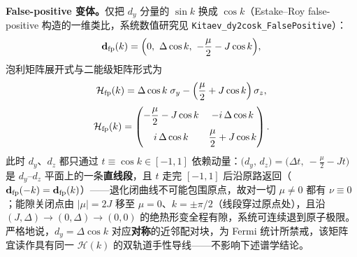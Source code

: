 \documentclass[onecolumn,aps,prl,superscriptaddress,longbibliography]{revtex4-2}
\begin{document}
\textbf{False-positive 变体。}仅把 $d_y$ 分量的 $\sin k$ 换成 $\cos k$（Estake--Roy false-positive 构造的一维类比，系统数值研究见 \texttt{Kitaev\_dy2cosk\_FalsePositive}）：
\begin{equation}\label{eq:fp_d}
\mathbf{d}_{\rm fp}(k) = \Big(0,\ \Delta\cos k,\ -\frac{\mu}{2} - J\cos k\Big),
\end{equation}
泡利矩阵展开式与二能级矩阵形式为
\begin{equation}\label{eq:fp_pauli}
\mathcal{H}_{\rm fp}(k) = \Delta\cos k\;\sigma_y - \Big(\frac{\mu}{2} + J\cos k\Big)\,\sigma_z,
\end{equation}
\begin{equation}\label{eq:fp_matrix}
\mathcal{H}_{\rm fp}(k) =
\begin{pmatrix}
-\dfrac{\mu}{2} - J\cos k & -i\,\Delta\cos k\\[8pt]
i\,\Delta\cos k & \dfrac{\mu}{2} + J\cos k
\end{pmatrix}.
\end{equation}
此时 $d_y$、$d_z$ 都只通过 $t \equiv \cos k \in [-1,1]$ 依赖动量：$\big(d_y,\,d_z\big) = \big(\Delta t,\ -\tfrac{\mu}{2} - Jt\big)$ 是 $d_y$--$d_z$ 平面上的一条\textbf{直线段}，且 $t$ 走完 $[-1,1]$ 后沿原路返回（$\mathbf{d}_{\rm fp}(-k) = \mathbf{d}_{\rm fp}(k)$）——退化闭曲线不可能包围原点，故对一切 $\mu \neq 0$ 都有 $\nu \equiv 0$；能隙关闭点由 $|\mu| = 2J$ 移至 $\mu = 0$、$k = \pm\pi/2$（线段穿过原点处），且沿 $(J,\Delta)\to(0,\Delta)\to(0,0)$ 的绝热形变全程有隙，系统可连续退到原子极限。严格地说，$d_y = \Delta\cos k$ 对应\textbf{对称}的近邻配对块，为 Fermi 统计所禁戒，该矩阵宜读作具有同一 $\mathcal{H}(k)$ 的双轨道手性导线——不影响下述谱学结论。
\end{document}
